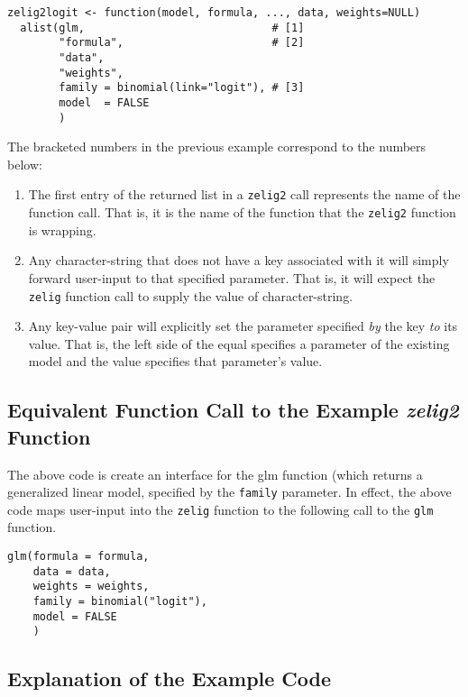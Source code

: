 \documentclass[11pt]{article}
\begin{document}
\begin{verbatim}
zelig2logit <- function(model, formula, ..., data, weights=NULL)
  alist(glm,                             # [1]
        "formula",                       # [2]
        "data",
        "weights",
        family = binomial(link="logit"), # [3]
        model  = FALSE
        )
\end{verbatim}

The bracketed numbers in the previous example correspond to the numbers below:

\begin{enumerate}
	\item{The first entry of the returned list in a {\tt zelig2} call represents the name of the function call.  That is, it is the name of the function that the {\tt zelig2} function is wrapping.}
	\item{Any character-string that does not have a key associated with it will simply forward user-input to that specified parameter.  That is, it will expect the {\tt zelig} function call to supply the value of character-string.}
	\item{Any key-value pair will explicitly set the parameter specified \emph{by} the key \emph{to} its value.  That is, the left side of the equal specifies a parameter of the existing model and the value specifies that parameter's value.}
\end{enumerate}



\subsection{Equivalent Function Call to the Example \emph{zelig2} Function}
The above code is create an interface for the glm function (which returns a generalized linear model, specified by the {\tt family} parameter.  In effect, the above code maps user-input into the {\tt zelig} function to the following call to the {\tt glm} function.

\begin{verbatim}
glm(formula = formula,
    data = data,
    weights = weights,
    family = binomial("logit"),
    model = FALSE
    )
\end{verbatim}


\subsection{Explanation of the Example Code}
\end{document}

